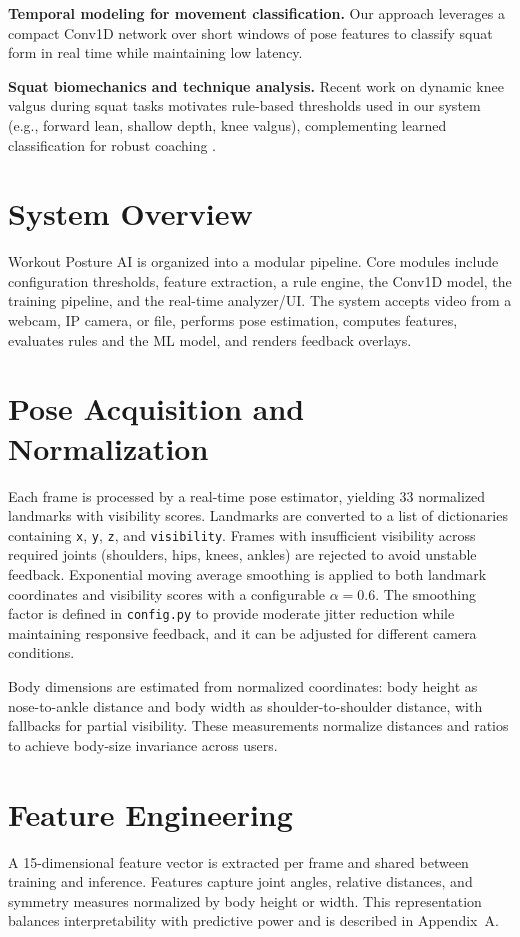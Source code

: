 \documentclass[11pt]{article}
\begin{document}
\textbf{Temporal modeling for movement classification.} Our approach leverages a compact Conv1D network over short windows of pose features to classify squat form in real time while maintaining low latency.

\textbf{Squat biomechanics and technique analysis.} Recent work on dynamic knee valgus during squat tasks motivates rule-based thresholds used in our system (e.g., forward lean, shallow depth, knee valgus), complementing learned classification for robust coaching \cite{khou2024valgus}.

\section{System Overview}
Workout Posture AI is organized into a modular pipeline. Core modules include configuration thresholds, feature extraction, a rule engine, the Conv1D model, the training pipeline, and the real-time analyzer/UI. The system accepts video from a webcam, IP camera, or file, performs pose estimation, computes features, evaluates rules and the ML model, and renders feedback overlays.

\section{Pose Acquisition and Normalization}
Each frame is processed by a real-time pose estimator, yielding 33 normalized landmarks with visibility scores. Landmarks are converted to a list of dictionaries containing \texttt{x}, \texttt{y}, \texttt{z}, and \texttt{visibility}. Frames with insufficient visibility across required joints (shoulders, hips, knees, ankles) are rejected to avoid unstable feedback. Exponential moving average smoothing is applied to both landmark coordinates and visibility scores with a configurable \(\alpha=0.6\). The smoothing factor is defined in \texttt{config.py} to provide moderate jitter reduction while maintaining responsive feedback, and it can be adjusted for different camera conditions.

Body dimensions are estimated from normalized coordinates: body height as nose-to-ankle distance and body width as shoulder-to-shoulder distance, with fallbacks for partial visibility. These measurements normalize distances and ratios to achieve body-size invariance across users.

\section{Feature Engineering}
A 15-dimensional feature vector is extracted per frame and shared between training and inference. Features capture joint angles, relative distances, and symmetry measures normalized by body height or width. This representation balances interpretability with predictive power and is described in Appendix~A.
\end{document}
